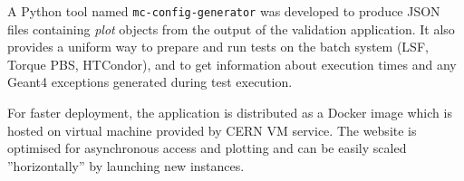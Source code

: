 A Python tool named {\tt mc-config-generator} was developed to produce JSON files containing \textit{plot} objects from the output of the validation application. It also provides a uniform way to prepare and run tests on the batch system (LSF, Torque PBS, HTCondor), and to get information about execution times and any Geant4 exceptions generated during test execution.

For faster deployment, the application is distributed as a Docker image which is hosted on virtual machine provided by CERN VM service. The website is optimised for asynchronous access and plotting and can be easily scaled ''horizontally'' by launching new instances.%